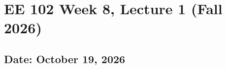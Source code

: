 \documentclass{ee102_notes}
\renewcommand{\releasedate}{October 19, 2026}
\begin{document}
\section*{EE 102 Week 8, Lecture 1 (Fall 2026)}
\subsection*{Date: \releasedate}
\tableofcontents

\end{document}
